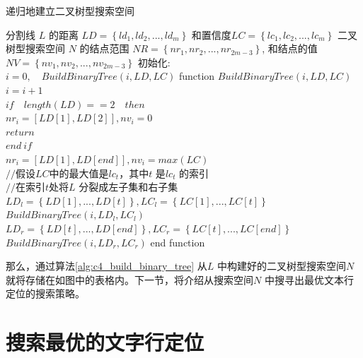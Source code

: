     \begin{algorithm}[!h]
	\renewcommand{\algorithmicrequire}{\textbf{输入:}}
	\renewcommand{\algorithmicensure}{\textbf{输出:}}
	\caption{递归地建立二叉树型搜索空间}
	\label{alg:c4_build_binary_tree}
	\begin{algorithmic}[1]
		\REQUIRE 分割线 $L$ 的距离 $LD=\left\{ld_1,ld_2,...,ld_m\right\}$ 和置信度$LC=\left\{lc_1,lc_2,...,lc_m\right\}$
		\ENSURE 二叉树型搜索空间 $N$ 的结点范围 $NR=\left\{nr_1,nr_2,...,nr_{2m-3}\right\}$, 和结点的值 $NV=\left\{nv_1,nv_2,...,nv_{2m-3}\right\}$
      \STATE 初始化: \\
      \STATE \quad $i=0, \quad BuildBinaryTree(i,LD,LC)$
      \STATE function $BuildBinaryTree(i,LD,LC)$
        \\\STATE \quad $i=i+1$
        \\\STATE \quad $if \quad length(LD)==2 \quad then$
        \\\STATE \qquad $nr_{i}=[LD[1],LD[2]], nv_{i}=0$
        \\\STATE \qquad $return$
        \\\STATE \quad $end \ if$
        \\\STATE \quad $nr_{i}=[LD[1],LD[end]], nv_{i}=max(LC)$
        \\\STATE \quad $//$假设$LC$中的最大值是$lc_t$，其中$t$ 是$lc_t$ 的索引
        \\\STATE \quad $//$在索引$t$处将$L$ 分裂成左子集和右子集
        \\\STATE \quad $LD_{l}=\left\{LD[1],...,LD[t]\right\}, LC_{l}=\left\{LC[1],...,LC[t]\right\}$
        \\\STATE \quad $BuildBinaryTree(i,LD_{l},LC_{l})$
        \\\STATE \quad $LD_{r}=\left\{LD[t],...,LD[end]\right\}, LC_{r}=\left\{LC[t],...,LC[end]\right\}$
        \\\STATE \quad $BuildBinaryTree(i,LD_{r},LC_{r})$
      \STATE end function
	\end{algorithmic}
    \end{algorithm}

    那么，通过算法\ref{alg:c4_build_binary_tree} 从$L$ 中构建好的二叉树型搜索空间$N$就将存储在如图中的表格内。下一节，将介绍从搜索空间$N$ 中搜寻出最优文本行定位的搜索策略。

    \section{搜索最优的文字行定位}

